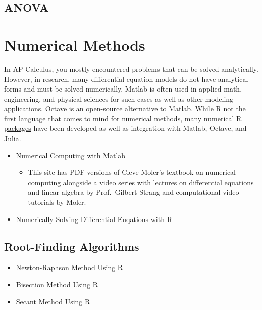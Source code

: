 \documentclass[]{book}
\providecommand{\tightlist}{%
  \setlength{\itemsep}{0pt}\setlength{\parskip}{0pt}}
\begin{document}
\hypertarget{anova}{%
\subsection{ANOVA}\label{anova}}

\hypertarget{numerical-methods}{%
\section{Numerical Methods}\label{numerical-methods}}

In AP Calculus, you mostly encountered problems that can be solved analytically. However, in research, many differential equation models do not have analytical forms and must be solved numerically. Matlab is often used in applied math, engineering, and physical sciences for such cases as well as other modeling applications. Octave is an open-source alternative to Matlab. While R not the first language that comes to mind for numerical methods, many \href{https://cran.r-project.org/web/views/NumericalMathematics.html}{numerical R packages} have been developed as well as integration with Matlab, Octave, and Julia.

\begin{itemize}
\tightlist
\item
  \href{https://www.mathworks.com/moler/chapters.html}{Numerical Computing with Matlab}

  \begin{itemize}
  \tightlist
  \item
    This site has PDF versions of Cleve Moler's textbook on numerical computing alongside a \href{https://www.mathworks.com/academia/courseware/learn-differential-equations.html}{video series} with lectures on differential equations and linear algebra by Prof.~Gilbert Strang and computational video tutorials by Moler.
  \end{itemize}
\item
  \href{http://rstudio-pubs-static.s3.amazonaws.com/32888_197d1a1896534397b67fb04e0d4899ae.html}{Numerically Solving Differential Euqations with R}
\end{itemize}

\hypertarget{root-finding-algorithms}{%
\subsection{Root-Finding Algorithms}\label{root-finding-algorithms}}

\begin{itemize}
\tightlist
\item
  \href{https://rpubs.com/aaronsc32/newton-raphson-method}{Newton-Raphson Method Using R}
\item
  \href{https://rpubs.com/aaronsc32/bisection-method-r}{Bisection Method Using R}
\item
  \href{https://rpubs.com/aaronsc32/secant-method-r}{Secant Method Using R}
\end{itemize}
\end{document}
